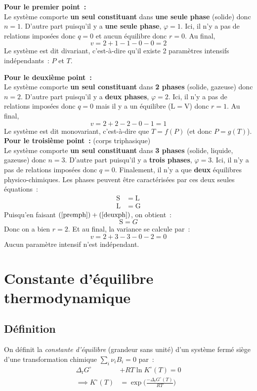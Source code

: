 \documentclass{article}
\let\oldref\ref
\renewcommand{\ref}[1]{(\oldref{#1})}
\newcommand{\Dr}{\Delta_{\mathrm{r}}}
\begin{document}
\begin{tableau}
\noindent\textbf{Pour le premier point~:}\\
    Le système comporte \textbf{un seul constituant} dans \textbf{une seule phase} (solide) donc $n=1$. D'autre part puisqu'il y a \textbf{une seule phase}, $\varphi=1$. Ici, il n'y a pas de relations imposées donc $q=0$ et aucun équilibre donc $r=0$. Au final,
    $$v=2+1-1-0-0=2$$
    Le système est dit divariant, c'est-à-dire qu'il existe 2 paramètres intensifs indépendants~: $P$ et $T$. \bigskip

\noindent\textbf{Pour le deuxième point~:}\\
    Le système comporte \textbf{un seul constituant} dans \textbf{2 phases} (solide, gazeuse) donc $n=2$. D'autre part puisqu'il y a \textbf{deux phases}, $\varphi=2$. Ici, il n'y a pas de relations imposées donc $q=0$ mais il y a un équilibre ($\mathrm{L=V}$) donc $r=1$. Au final,
    $$v=2+2-2-0-1=1$$
    Le système est dit monovariant, c'est-à-dire que $T=f(P)$ (et donc $P = g(T)$).\\
    
\noindent\textbf{Pour le troisième point~:} (corps triphasique\protect\footnotemark)\\
    Le système comporte \textbf{un seul constituant} dans \textbf{3 phases} (solide, liquide, gazeuse) donc $n=3$. D'autre part puisqu'il y a \textbf{trois phases}, $\varphi=3$. Ici, il n'y a pas de relations imposées donc $q=0$. Finalement, il n'y a que \textbf{deux} équilibres physico-chimiques. Les phases peuvent être caractérisées par ces deux seules équations~:
    \begin{align}
        \mathrm{S}&=\mathrm{L}\label{premph}\\
        \mathrm{L}&=\mathrm{G}\label{deuxph}
    \end{align}
    Puisqu'en faisant $\ref{premph}+\ref{deuxph}$, on obtient~:
    $$\mathrm{S}=G$$
    Donc on a bien $r=2$. Et au final, la variance se calcule par~:
    $$v=2+3-3-0-2=0$$
    Aucun paramètre intensif n'est indépendant.
\end{tableau}
\section{Constante d'équilibre thermodynamique}
\subsection{Définition}
\begin{tableau}
    \begin{enonce}
        On définit la \textit{constante d'équilibre} (grandeur sans unité) d'un système fermé siège d'une transformation chimique $\sum_i\nu_i B_i = 0$ par~:
        \begin{align}
            \Dr G^\circ &+ RT\ln K^\circ(T) = 0\label{defcst}\\
            \implies K^\circ(T) &= \exp\bigg(\frac{-\Dr G^\circ(T)}{RT}\bigg)\nonumber
        \end{align}
    \end{enonce}
\end{tableau}
\end{document}
